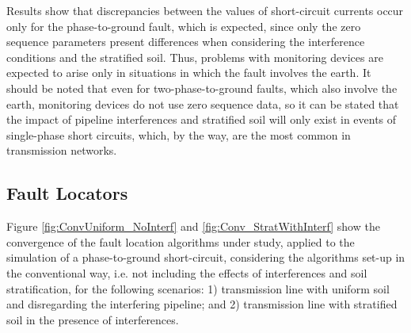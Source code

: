 \documentclass[conference]{IEEEtran}
\begin{document}
Results show that discrepancies between the values of short-circuit currents occur only for the phase-to-ground fault, which is expected, since only the zero sequence parameters present differences when considering the interference conditions and the stratified soil. Thus, problems with monitoring devices are expected to arise only in situations in which the fault involves the earth. It should be noted that even for two-phase-to-ground faults, which also involve the earth, monitoring devices do not use zero sequence data, so it can be stated that the impact of pipeline interferences and stratified soil will only exist in events of single-phase short circuits, which, by the way, are the most common in transmission networks. 

\subsection{Fault Locators}

Figure \ref{fig:ConvUniform_NoInterf} and \ref{fig:Conv_StratWithInterf} show the convergence of the fault location algorithms under study, applied to the simulation of a phase-to-ground short-circuit, considering the algorithms set-up in the conventional way, i.e. not including the effects of interferences and soil stratification, for the following scenarios: 1) transmission line with uniform soil and disregarding the interfering pipeline; and 2) transmission line with stratified soil in the presence of interferences.
\end{document}

